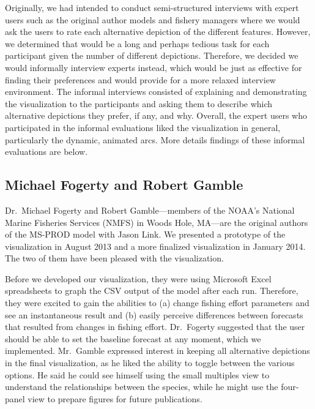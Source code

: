 Originally, we had intended to conduct semi-structured interviews with expert users such as the original author models and fishery managers where we would ask the users to rate each alternative depiction of the different features.  However, we determined that would be a long and perhaps tedious task for each participant given the number of different depictions.  Therefore, we decided we would informally interview experts instead, which would be just as effective for finding their preferences and would provide for a more relaxed interview environment.  The informal interviews consisted of explaining and demonstrating the visualization to the participants and asking them to describe which alternative depictions they prefer, if any, and why.  Overall, the expert users who participated in the informal evaluations liked the visualization in general, particularly the dynamic, animated arcs.  More details findings of these informal evaluations are below.

\subsection{Michael Fogerty and Robert Gamble} %

Dr.\ Michael Fogerty and Robert Gamble---members of the NOAA's National Marine Fisheries Services (NMFS) in Woods Hole, MA---are the original authors of the MS-PROD model with Jason Link.  We presented a prototype of the visualization in August 2013 and a more finalized visualization in January 2014.  The two of them have been pleased with the visualization.

Before we developed our visualization, they were using Microsoft Excel spreadsheets to graph the CSV output of the model after each run.  Therefore, they were excited to gain the abilities to (a) change fishing effort parameters and see an instantaneous result and (b) easily perceive differences between forecasts that resulted from changes in fishing effort.  Dr.\ Fogerty suggested that the user should be able to set the baseline forecast at any moment, which we implemented.  Mr.\ Gamble expressed interest in keeping all alternative depictions in the final visualization, as he liked the ability to toggle between the various options.  He said he could see himself using the small multiples view to understand the relationships between the species, while he might use the four-panel view to prepare figures for future publications.

